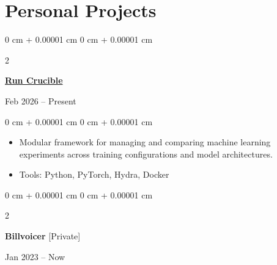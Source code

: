 \documentclass[10pt, letterpaper]{article}
\newenvironment{highlights}{
    \begin{itemize}[
        topsep=0.10 cm,
        parsep=0.10 cm,
        partopsep=0pt,
        itemsep=0pt,
        leftmargin=0 cm + 10pt
    ]
}{
    \end{itemize}
} %
\newenvironment{onecolentry}{
    \begin{adjustwidth}{
        0 cm + 0.00001 cm
    }{
        0 cm + 0.00001 cm
    }
}{
    \end{adjustwidth}
} %
\newenvironment{twocolentry}[2][]{
    \onecolentry
    \def\secondColumn{#2}
    \setcolumnwidth{\fill, 3.5 cm} %
    \begin{paracol}{2}
}{
    \switchcolumn \raggedleft \secondColumn
    \end{paracol}
    \endonecolentry
} %
\let\hrefWithoutArrow\href
\begin{document}
    


    \section{Personal Projects}

    
        
            \begin{twocolentry}{
                Feb 2026 -- Present
            }
                
                    \hrefWithoutArrow{https://github.com/hjisaac/run-crucible}{\textbf{Run Crucible} \faGithub{}}
                
            \end{twocolentry}

            \vspace{0.10 cm}
            \begin{onecolentry}
                \begin{highlights}
                    \item Modular framework for managing and comparing machine learning experiments across training configurations and model architectures.
                    
                    \item Tools: Python, PyTorch, Hydra, Docker
                \end{highlights}
            \end{onecolentry}
            \vspace{0.2 cm}
        
            \begin{twocolentry}{
                Jan 2023 -- Now
            }
                
                    \textbf{Billvoicer} [Private]
                
            \end{twocolentry}
\end{document}
